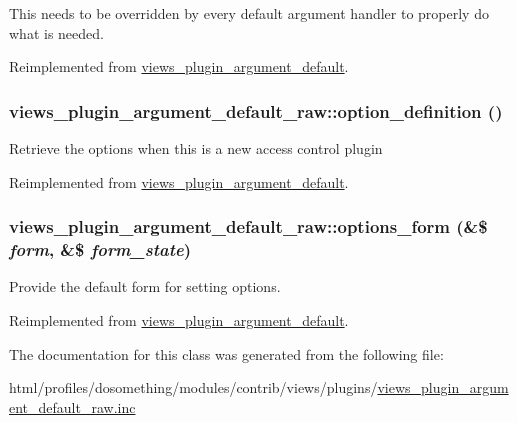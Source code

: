 This needs to be overridden by every default argument handler to properly do what is needed. 

Reimplemented from \hyperlink{classviews__plugin__argument__default_a8e67864f4a1ce20b12bc82afe1acd255}{views\_\-plugin\_\-argument\_\-default}.\hypertarget{classviews__plugin__argument__default__raw_a0301eba461bac2c3b80dde1978c476fe}{
\subsubsection[{option\_\-definition}]{\setlength{\rightskip}{0pt plus 5cm}views\_\-plugin\_\-argument\_\-default\_\-raw::option\_\-definition ()}}
\label{classviews__plugin__argument__default__raw_a0301eba461bac2c3b80dde1978c476fe}
Retrieve the options when this is a new access control plugin 

Reimplemented from \hyperlink{classviews__plugin__argument__default_ac3a58218880857bc009d4617fab2241b}{views\_\-plugin\_\-argument\_\-default}.\hypertarget{classviews__plugin__argument__default__raw_a59d56d66b37523fc25b7a83f097c4f76}{
\subsubsection[{options\_\-form}]{\setlength{\rightskip}{0pt plus 5cm}views\_\-plugin\_\-argument\_\-default\_\-raw::options\_\-form (\&\$ {\em form}, \/  \&\$ {\em form\_\-state})}}
\label{classviews__plugin__argument__default__raw_a59d56d66b37523fc25b7a83f097c4f76}
Provide the default form for setting options. 

Reimplemented from \hyperlink{classviews__plugin__argument__default_a9bc59dae448f4c35d422bc54d0879930}{views\_\-plugin\_\-argument\_\-default}.

The documentation for this class was generated from the following file:\begin{DoxyCompactItemize}
\item 
html/profiles/dosomething/modules/contrib/views/plugins/\hyperlink{views__plugin__argument__default__raw_8inc}{views\_\-plugin\_\-argument\_\-default\_\-raw.inc}\end{DoxyCompactItemize}
